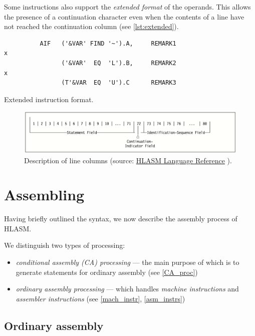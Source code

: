 Some instructions also support the \emph{extended format} of the operands. This allows the presence of a continuation character even when the contents of a line have not reached the continuation column (see \cref{lst:extended}).

\begin{listing}[t]
	\begin{verbatim}
          AIF   ('&VAR' FIND '~').A,     REMARK1                        x
                ('&VAR'  EQ  'L').B,     REMARK2                        x
                (T'&VAR  EQ  'U').C      REMARK3 
	\end{verbatim}
	\caption{Extended instruction format.}
	\label{lst:extended}
\end{listing}

\begin{figure}
	\includegraphics[width=\textwidth]{img/line}
	\caption{Description of line columns (source: \href{https://www-01.ibm.com/servers/resourcelink/svc00100.nsf/pages/zOSV2R3sc264940/$file/asmr1023.pdf}{HLASM Language Reference} ).}
	\label{fig01:line}
\end{figure}


\section{Assembling}
\label{Assembling}

Having briefly outlined the syntax, we now describe the assembly process of HLASM. 

We distinguish two types of processing:

\begin{itemize}
	\item \emph{conditional assembly (CA) processing} --- the main purpose of which is to generate statements for ordinary assembly (see \cref{CA_proc})
	\item \emph{ordinary assembly processing} --- which handles \emph{machine instructions} and \emph{assembler instructions} (see \cref{mach_instr}, \cref{asm_instrs})
\end{itemize}

\subsection{Ordinary assembly}

